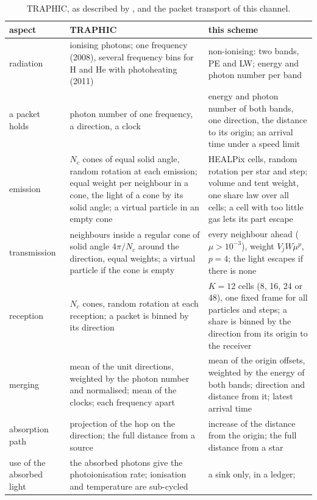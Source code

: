 \begin{table}[!htbp]
\centering
\caption{TRAPHIC, as described by \citet{PawlikSchaye2008,PawlikSchaye2011},
and the packet transport of this channel.}
\label{tab:isrf-traphic}
\footnotesize
\begin{tabular}{>{\raggedright\arraybackslash}p{2.3cm}>{\raggedright\arraybackslash}p{5.9cm}>{\raggedright\arraybackslash}p{5.9cm}}
\toprule
aspect & TRAPHIC & this scheme \\
\midrule
radiation & ionising photons; one frequency (2008), several frequency bins
  for H and He with photoheating (2011) & non-ionising: two bands, PE and LW;
  energy and photon number per band \\
a packet holds & photon number of one frequency, a direction, a clock & energy
  and photon number of both bands, one direction, the distance to its origin;
  an arrival time under a speed limit \\
emission & $N_c$ cones of equal solid angle, random rotation at each emission;
  equal weight per neighbour in a cone, the light of a cone by its solid
  angle; a virtual particle in an empty cone & 12 HEALPix cells, random
  rotation per star and step; volume and tent weight, one share law over all
  cells; a cell with too little gas lets its part escape \\
transmission & neighbours inside a regular cone of solid angle $4\pi/N_c$
  around the direction, equal weights; a virtual particle if the cone is empty
  & every neighbour ahead ($\mu>10^{-3}$), weight $V_jW\mu^p$, $p=4$; the
  light escapes if there is none \\
reception & $N_c$ cones, random rotation at each reception; a packet is binned
  by its direction & $K=12$ cells (8, 16, 24 or 48), one fixed frame for all particles
  and steps; a share is binned by the direction from its origin to the
  receiver \\
merging & mean of the unit directions, weighted by the photon number and
  normalised; mean of the clocks; each frequency apart & mean of the origin
  offsets, weighted by the energy of both bands; direction and distance
  from it; latest arrival time \\
absorption path & projection of the hop on the direction; the full distance
  from a source & increase of the distance from the origin; the full distance
  from a star \\
use of the absorbed light & the absorbed photons give the photoionisation
  rate; ionisation and temperature are sub-cycled & a sink only, in a ledger;

\end{tabular}
\end{table}
